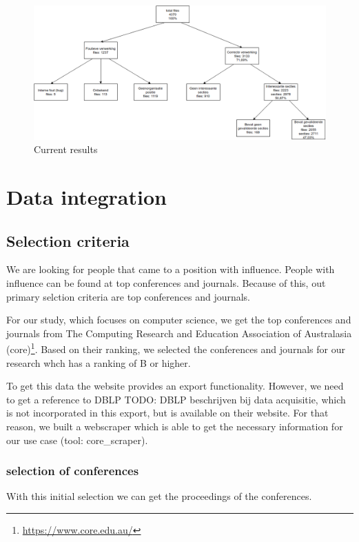 \documentclass{ou-report}
\newcommand{\todo}[1]{{\color{red} TODO: #1}}
\begin{document}
\begin{figure}[H]
    \centering
    \includegraphics[width=17cm]{images/lncs_front_matter_result.drawio.png}
    \caption{Current results}
    \label{fig:lncs_pdf_database}
\end{figure}


\chapter{Data integration}

\section{Selection criteria}
We are looking for people that came to a position with influence.
People with influence can be found at top conferences and journals.
Because of this, out primary selction criteria are top conferences and journals.

For our study, which focuses on computer science, we get the top conferences 
and journals from The Computing Research and Education Association of 
Australasia (core)\footnote{\url{https://www.core.edu.au/}}. Based on their 
ranking, we selected the conferences and journals for our research whch has
a ranking of B or higher.

To get this data the website provides an export functionality. However, we need
to get a reference to DBLP\todo{DBLP beschrijven bij data acquisitie}, which is not incorporated in this export, but is 
available on their website. For that reason, we built a webscraper which is able
to get the necessary information for our use case (tool: core\_scraper). 

\subsection{selection of conferences}
With this initial selection we can get the proceedings of the conferences.
\end{document}
